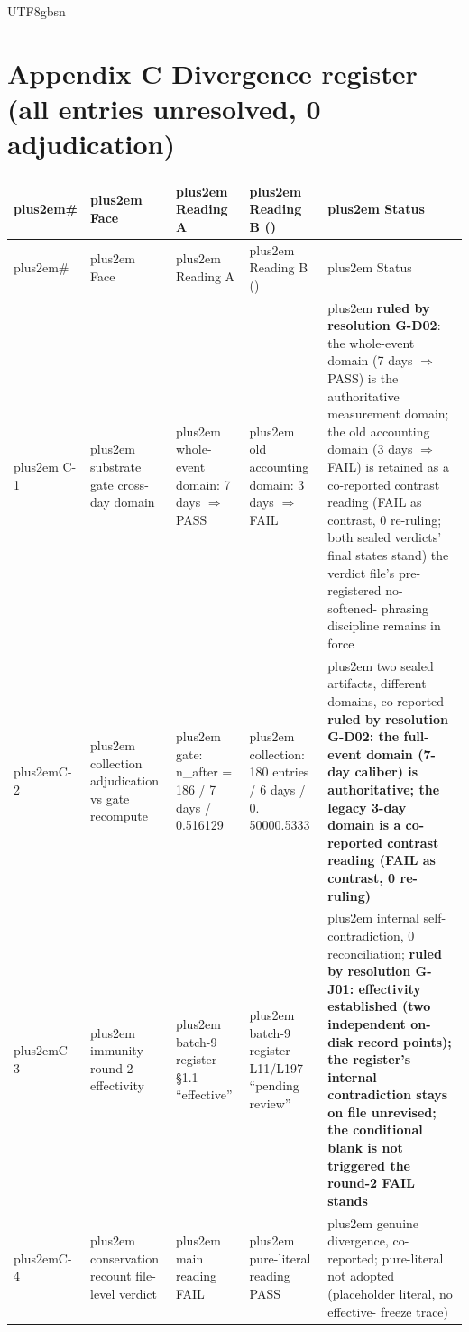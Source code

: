 \documentclass[11pt,letterpaper]{article}
\newcommand{\RaggedRight}{\rightskip=0pt plus2em\relax}
\begin{document}
\begin{CJK}{UTF8}{gbsn}
\section*{Appendix C \textemdash{} Divergence register (all entries unresolved, 0 adjudication)}

{\footnotesize\linespread{0.92}\selectfont\begin{longtable}{>{\RaggedRight\arraybackslash}p{1.54cm} >{\RaggedRight\arraybackslash}p{3.04cm} >{\RaggedRight\arraybackslash}p{3.04cm} >{\RaggedRight\arraybackslash}p{3.04cm} >{\RaggedRight\arraybackslash}p{3.04cm}}
\toprule
\# & Face & Reading A & Reading B (\textellipsis{}) & Status \\
\midrule
\endfirsthead
\toprule
\# & Face & Reading A & Reading B (\textellipsis{}) & Status \\
\midrule
\endhead
\endfoot
\bottomrule
\endlastfoot
C-1 & substrate gate cross-day domain & whole-event domain: 7 days \ensuremath{\Rightarrow} PASS & old accounting domain: 3 days \ensuremath{\Rightarrow} FAIL & \textbf{ruled by resolution G-D02}: the whole-event domain (7 days \ensuremath{\Rightarrow} PASS) is the authoritative measurement domain; the old accounting domain (3 days \ensuremath{\Rightarrow} FAIL) is retained as a co-reported contrast reading (FAIL as contrast, 0 re-ruling; both sealed verdicts' final states stand) \textemdash{} the verdict file's pre-registered no-\penalty-100 softened-\penalty-100 phrasing discipline remains in force \\
C-2 & collection adjudication vs gate recompute & gate: n\_after = 186 / 7 days / 0.516129 & collection: 180 entries / 6 days / 0.\penalty-100 5000\textendash{}0.5333 & two sealed artifacts, different domains, co-reported \textemdash{} \textbf{ruled by resolution G-D02: the full-event domain (7-day caliber) is authoritative; the legacy 3-day domain is a co-reported contrast reading (FAIL as contrast, 0 re-ruling)} \\
C-3 & immunity round-2 effectivity & batch-9 register \S{}1.1 ``effective'' & batch-9 register L11/L197 ``pending review'' & internal self-\penalty-100 contradiction, 0 reconciliation; \textbf{ruled by resolution G-J01: effectivity established (two independent on-disk record points); the register's internal contradiction stays on file unrevised; the conditional blank is not triggered \textemdash{} the round-2 FAIL stands} \\
C-4 & conservation recount file-level verdict & main reading FAIL & pure-literal reading PASS & genuine divergence, co-reported; pure-literal not adopted (placeholder literal, no effective-\penalty-100 freeze trace) \\

\end{longtable}}
\end{CJK}
\end{document}
